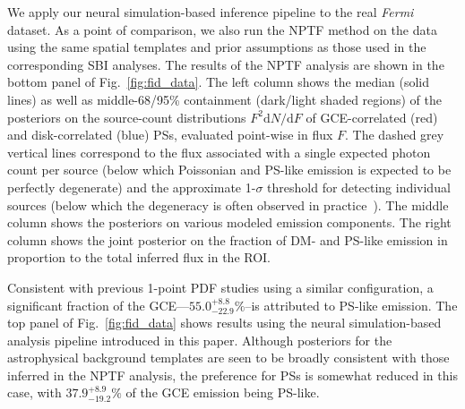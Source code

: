 \documentclass[]{article}
\newcommand{\Fermi}{\emph{Fermi}\xspace}
\newcommand{\dd}{\mathrm{d}}
\begin{document}
We apply our neural simulation-based inference pipeline to the real \Fermi dataset. As a point of comparison, we also run the NPTF method on the data using the same spatial templates and prior assumptions as those used in the corresponding SBI analyses. 
The results of the NPTF analysis are shown in the bottom panel of Fig.~\ref{fig:fid_data}. The left column shows the median (solid lines) as well as middle-68/95\% containment (dark/light shaded regions) of the posteriors on the source-count distributions $F^2 \dd N/\dd F$ of GCE-correlated (red) and disk-correlated (blue) PSs, evaluated point-wise in flux $F$. The dashed grey vertical lines correspond to the flux associated with a single expected photon count per source (below which Poissonian and PS-like emission is expected to be perfectly degenerate) and the approximate 1-$\sigma$ threshold for detecting individual sources (below which the degeneracy is often observed in practice~\cite{Chang:2019ars,Buschmann:2020adf}). The middle column shows the posteriors on various modeled emission components.
The right column shows the joint posterior on the fraction of DM- and PS-like emission in proportion to the total inferred flux in the ROI.

Consistent with previous 1-point PDF studies using a similar configuration, a significant fraction of the GCE---$55.0^{+8.8}_{-22.9}\%$--is attributed to PS-like emission.
The top panel of Fig.~\ref{fig:fid_data} shows results using the neural simulation-based analysis pipeline introduced in this paper. Although posteriors for the astrophysical background templates are seen to be broadly consistent with those inferred in the NPTF analysis, the preference for PSs is somewhat reduced in this case, with $ 37.9^{+8.9}_{-19.2}\%$ of the GCE emission being PS-like. 

\end{document}
